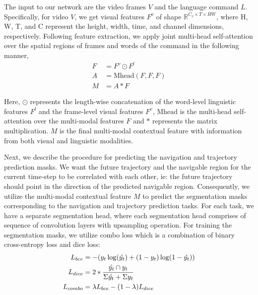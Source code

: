 \documentclass[11pt]{article}
\begin{document}


The input to our network are the video frames $V$ and the language command $L$. Specifically, for video $V$, we get visual features $F^v$ of shape $ \mathbb R^{C_v \times T \times HW}$, where H, W, T, and C represent the height, width, time, and channel dimensions, respectively. Following feature extraction, we apply joint multi-head self-attention over the spatial regions of frames and words of the command in the following manner,
\begin{equation} \label{eq1}
\begin{split}
    F &= F^v \odot F^l \\
    A &= \text{Mhead}(F, F, F)\\
    M &= A \ast F
\end{split}
\end{equation}

Here, $\odot$ represents the length-wise concatenation of the word-level linguistic features $F^l$ and the frame-level visual features $F^v$, $\text{Mhead}$ is the multi-head self-attention over the multi-modal features $F$ and $\ast$ represents the matrix multiplication. $M$ is the final multi-modal contextual feature with information from both visual and linguistic modalities.

Next, we describe the procedure for predicting the navigation and trajectory prediction masks. We want the future trajectory and the navigable region for the current time-step to be correlated with each other, ie: the future trajectory should point in the direction of the predicted navigable region. Consequently, we utilize the multi-modal contextual feature $M$ to predict the segmentation masks corresponding to the navigation and trajectory prediction tasks. For each task, we have a separate segmentation head, where each segmentation head comprises of sequence of convolution layers with upsampling operation. For training the segmentation masks, we utilize combo loss \cite{taghanaki2019combo} which is a combination of binary cross-entropy loss and dice loss:
\begin{equation} \label{eq2}
\begin{split}
    L_{bce} &= -{(y_{t}\log(\hat{y_{t}}) + (1 - y_{t})\log(1 - \hat{y_{t}}))}\\
    L_{dice} &= 2 * \frac{\hat{y_{t}} \cap y_{t}}{\Sigma{\hat{y_{t}}} + \Sigma{y_{t}}}\\        L_{combo} &= \lambda L_{bce} - (1 - \lambda) L_{dice}
\end{split}
\raisetag{3\normalbaselineskip}
\end{equation}
\end{document}
